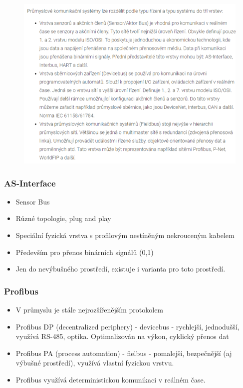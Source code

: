 \begin{figure}[!h]
  \begin{center}
    \includegraphics[scale = 1]{img/Picture18.png}
  \end{center}
\end{figure}

\newpage

\subsubsection*{AS-Interface}
\begin{itemize}
  \item Sensor Bus
  \item Různé topologie, plug and play 
  \item Speciální fyzická vrstva s profilovým nestíněným nekrouceným kabelem
  \item Především pro přenos binárních signálů (0,1)
  \item Jen do nevýbušného prostředí, existuje i varianta pro toto prostředí.
\end{itemize}

\subsubsection*{Profibus}

\begin{itemize}
  \item V průmyslu je stále nejrozšířenějším protokolem
  \item Profibus DP (decentralized periphery) - devicebus - rychlejší, jednodušší, využívá RS-485, optika. Optimalizován na výkon, cyklický přenos dat
  \item Profibus PA (process automation) - fielbus - pomalejší, bezpečnější (aj výbušné prostředí), využívá vlastní fyzickou vrstvu.
  \item Profibus využívá deterministickou komunikaci v reálném čase.
\end{itemize}


